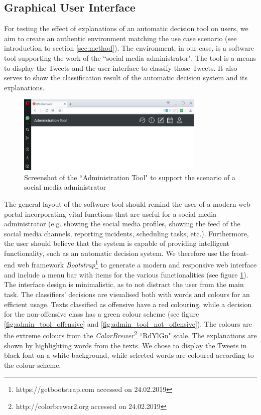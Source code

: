 \subsection{Graphical User Interface}
For testing the effect of explanations of an automatic decision tool on users, we aim to create an authentic environment matching the use case scenario (see introduction to section \ref{sec:method}). The environment, in our case, is a software tool supporting the work of the ``social media administrator". The tool is a means to display the Tweets and the user interface to classify those Tweets. It also serves to show the classification result of the automatic decision system and its explanations.\newline
\begin{figure} [H]
	\centering
	\includegraphics[width=0.8\textwidth]{img/administrationTool.JPG}
	\caption{Screenshot of the ``Administration Tool" to support the scenario of a social media administrator}
	\label{fig:admin_tool}
\end{figure}
\noindent The general layout of the software tool should remind the user of a modern web portal incorporating vital functions that are useful for a social media administrator (e.g. showing the social media profiles, showing the feed of the social media channels, reporting incidents, scheduling tasks, etc.). Furthermore, the user should believe that the system is capable of providing intelligent functionality, such as an automatic decision system. We therefore use the front-end web framework \textit{Bootstrap}\footnote{https://getbootstrap.com accessed on 24.02.2019} to generate a modern and responsive web interface and include a menu bar with items for the various functionalities (see figure \ref{fig:admin_tool}). The interface design is minimalistic, as to not distract the user from the main task.\newline
The classifiers' decisions are visualised both with words and colours for an efficient usage. Texts classified as offensive have a red colouring, while a decision for the non-offensive class has a green colour scheme (see figure \ref{fig:admin_tool_offensive} and \ref{fig:admin_tool_not_offensive}). The colours are the extreme colours from the \textit{ColorBrewer}\footnote{http://colorbrewer2.org accessed on 24.02.2019} ``RdYlGn" scale. The explanations are shown by highlighting words from the texts. We chose to display the Tweets in black font on a white background, while selected words are coloured according to the colour scheme.\newline
